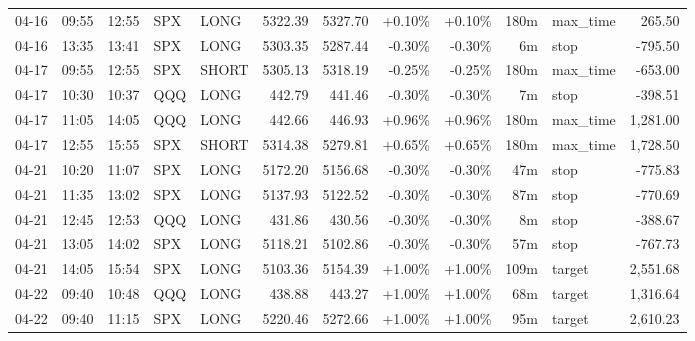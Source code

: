 \documentclass[11pt,a4paper,twoside]{article}
\begin{document}
\begin{center}
\begin{longtable}{>{\color{txtmain}}l l l l l r r r r r >{\color{txtmain}}l r}
04-16 & 09:55 & 12:55 & SPX & LONG & 5322.39 & 5327.70 & \textcolor{wingreen}{+0.10\%} & \textcolor{wingreen}{+0.10\%} & 180m & max\_time & \textcolor{wingreen}{265.50} \\
04-16 & 13:35 & 13:41 & SPX & LONG & 5303.35 & 5287.44 & \textcolor{lossred}{-0.30\%} & \textcolor{lossred}{-0.30\%} & 6m & stop & \textcolor{lossred}{-795.50} \\
04-17 & 09:55 & 12:55 & SPX & SHORT & 5305.13 & 5318.19 & \textcolor{lossred}{-0.25\%} & \textcolor{lossred}{-0.25\%} & 180m & max\_time & \textcolor{lossred}{-653.00} \\
04-17 & 10:30 & 10:37 & QQQ & LONG & 442.79 & 441.46 & \textcolor{lossred}{-0.30\%} & \textcolor{lossred}{-0.30\%} & 7m & stop & \textcolor{lossred}{-398.51} \\
04-17 & 11:05 & 14:05 & QQQ & LONG & 442.66 & 446.93 & \textcolor{wingreen}{+0.96\%} & \textcolor{wingreen}{+0.96\%} & 180m & max\_time & \textcolor{wingreen}{1,281.00} \\
04-17 & 12:55 & 15:55 & SPX & SHORT & 5314.38 & 5279.81 & \textcolor{wingreen}{+0.65\%} & \textcolor{wingreen}{+0.65\%} & 180m & max\_time & \textcolor{wingreen}{1,728.50} \\
04-21 & 10:20 & 11:07 & SPX & LONG & 5172.20 & 5156.68 & \textcolor{lossred}{-0.30\%} & \textcolor{lossred}{-0.30\%} & 47m & stop & \textcolor{lossred}{-775.83} \\
04-21 & 11:35 & 13:02 & SPX & LONG & 5137.93 & 5122.52 & \textcolor{lossred}{-0.30\%} & \textcolor{lossred}{-0.30\%} & 87m & stop & \textcolor{lossred}{-770.69} \\
04-21 & 12:45 & 12:53 & QQQ & LONG & 431.86 & 430.56 & \textcolor{lossred}{-0.30\%} & \textcolor{lossred}{-0.30\%} & 8m & stop & \textcolor{lossred}{-388.67} \\
04-21 & 13:05 & 14:02 & SPX & LONG & 5118.21 & 5102.86 & \textcolor{lossred}{-0.30\%} & \textcolor{lossred}{-0.30\%} & 57m & stop & \textcolor{lossred}{-767.73} \\
04-21 & 14:05 & 15:54 & SPX & LONG & 5103.36 & 5154.39 & \textcolor{wingreen}{+1.00\%} & \textcolor{wingreen}{+1.00\%} & 109m & target & \textcolor{wingreen}{2,551.68} \\
04-22 & 09:40 & 10:48 & QQQ & LONG & 438.88 & 443.27 & \textcolor{wingreen}{+1.00\%} & \textcolor{wingreen}{+1.00\%} & 68m & target & \textcolor{wingreen}{1,316.64} \\
04-22 & 09:40 & 11:15 & SPX & LONG & 5220.46 & 5272.66 & \textcolor{wingreen}{+1.00\%} & \textcolor{wingreen}{+1.00\%} & 95m & target & \textcolor{wingreen}{2,610.23} \\

\end{longtable}
\end{center}
\end{document}

